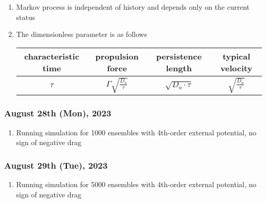\documentclass[12pt]{scrartcl}
\numberwithin{equation}{subsubsection}
\begin{document}
\begin{enumerate}
\item Markov process is independent of history and depends only on the current status

\item The dimensionless parameter is as follows
\begin{center}
    \begin{tabular}{||c|c|c|c||} 
        \hline
        characteristic time & propulsion force & persistence length & typical velocity \\
        \hline\hline
        $\tau$ & $\Gamma\sqrt{\frac{D_a}{\tau}}$ & $\sqrt{D_a\cdot\tau}$ & $\sqrt{\frac{D_a}{\tau}}$ \\
        \hline
    \end{tabular}
\end{center}

\end{enumerate}

\subsubsection{August 28th (Mon), 2023}

\begin{enumerate}
    \item Running simulation for 1000 ensembles with 4th-order external potential, no sign of negative drag
\end{enumerate}

\subsubsection{August 29th (Tue), 2023}

\begin{enumerate}
    \item Running simulation for 5000 ensembles with 4th-order external potential, no sign of negative drag
\end{enumerate}



\end{document}
